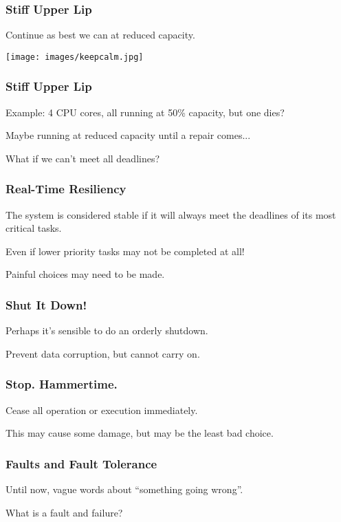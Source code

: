 \begin{frame}
\frametitle{Stiff Upper Lip}

Continue as best we can at reduced capacity.

\begin{center}
	\texttt{[image: images/keepcalm.jpg]}
\end{center}

\end{frame}

\begin{frame}
\frametitle{Stiff Upper Lip}

Example: 4 CPU cores, all running at 50\% capacity, but one dies?

Maybe running at reduced capacity until a repair comes...

What if we can't meet all deadlines?

\end{frame}

\begin{frame}
\frametitle{Real-Time Resiliency}

The system is considered \alert{stable} if it will always meet the deadlines of its most critical tasks.

Even if lower priority tasks may not be completed at all!

Painful choices may need to be made.

\end{frame}

\begin{frame}
\frametitle{Shut It Down!}

Perhaps it's sensible to do an orderly shutdown.

Prevent data corruption, but cannot carry on.

\end{frame}

\begin{frame}
\frametitle{Stop. Hammertime.}

Cease all operation or execution immediately.

This may cause some damage, but may be the least bad choice.

\end{frame}

\begin{frame}
\frametitle{Faults and Fault Tolerance}

Until now, vague words about ``something going wrong''.

What is a fault and failure?

\end{frame}

